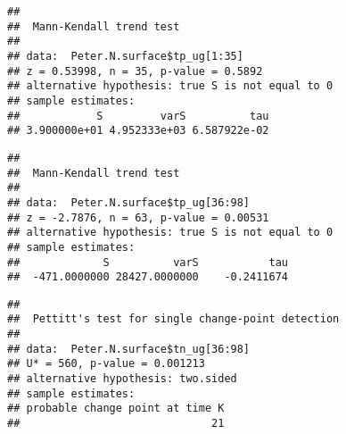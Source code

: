 \documentclass[]{article}
\newenvironment{Shaded}{\begin{snugshade}}{\end{snugshade}}
\newcommand{\KeywordTok}[1]{\textcolor[rgb]{0.13,0.29,0.53}{\textbf{#1}}}
\newcommand{\DecValTok}[1]{\textcolor[rgb]{0.00,0.00,0.81}{#1}}
\newcommand{\CommentTok}[1]{\textcolor[rgb]{0.56,0.35,0.01}{\textit{#1}}}
\newcommand{\OperatorTok}[1]{\textcolor[rgb]{0.81,0.36,0.00}{\textbf{#1}}}
\newcommand{\NormalTok}[1]{#1}
\begin{document}
\begin{verbatim}
## 
##  Mann-Kendall trend test
## 
## data:  Peter.N.surface$tp_ug[1:35]
## z = 0.53998, n = 35, p-value = 0.5892
## alternative hypothesis: true S is not equal to 0
## sample estimates:
##            S         varS          tau 
## 3.900000e+01 4.952333e+03 6.587922e-02
\end{verbatim}

\begin{Shaded}
\end{Shaded}

\begin{verbatim}
## 
##  Mann-Kendall trend test
## 
## data:  Peter.N.surface$tp_ug[36:98]
## z = -2.7876, n = 63, p-value = 0.00531
## alternative hypothesis: true S is not equal to 0
## sample estimates:
##             S          varS           tau 
##  -471.0000000 28427.0000000    -0.2411674
\end{verbatim}

\begin{Shaded}
\end{Shaded}

\begin{verbatim}
## 
##  Pettitt's test for single change-point detection
## 
## data:  Peter.N.surface$tn_ug[36:98]
## U* = 560, p-value = 0.001213
## alternative hypothesis: two.sided
## sample estimates:
## probable change point at time K 
##                              21
\end{verbatim}

\begin{Shaded}
\end{Shaded}
\end{document}
